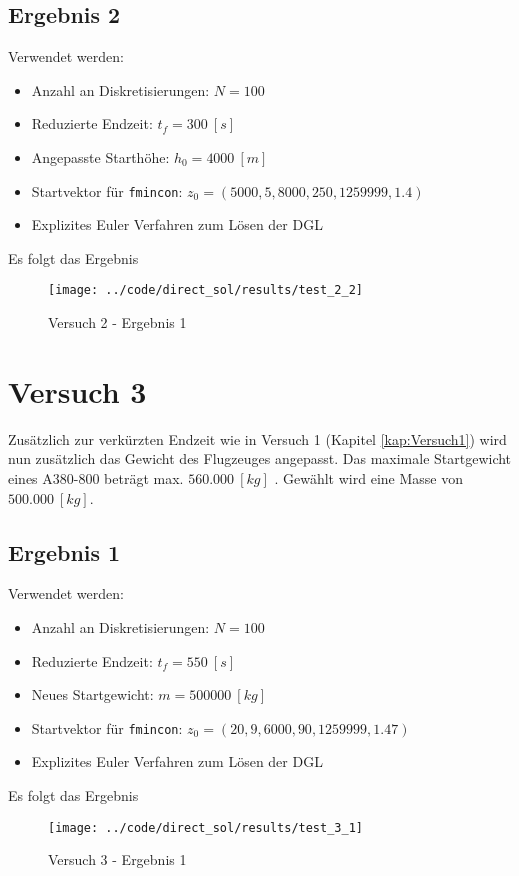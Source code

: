 \newpage
\subsection{Ergebnis 2}\label{kap:Versuch22}
Verwendet werden:
\begin{itemize}
\item Anzahl an Diskretisierungen: $N = 100$ 
\item Reduzierte Endzeit: $t_f = 300 \ [s]$
\item Angepasste Starthöhe: $h_0 = 4000 \ [m]$
\item Startvektor für \texttt{fmincon}: $z_0 = (5000,5,8000,250,1259999,1.4)$
\item Explizites Euler Verfahren zum Lösen der DGL
\end{itemize}
Es folgt das Ergebnis
\begin{figure}[H]
\begin{center}
\texttt{[image: ../code/direct\_sol/results/test\_2\_2]}
\caption{Versuch 2 - Ergebnis 1}\label{img:test_2_2}
\end{center}
\end{figure}
















\newpage
\section{Versuch 3}\label{kap:Versuch3}
Zusätzlich zur verkürzten Endzeit wie in Versuch 1 (Kapitel \ref{kap:Versuch1}) wird nun zusätzlich das Gewicht des Flugzeuges angepasst. Das maximale Startgewicht eines A380-800 beträgt max. $560.000 \ [kg]$ \cite{A380Tech}. Gewählt wird eine Masse von $500.000 \ [kg]$.

\subsection{Ergebnis 1}\label{kap:Versuch31}
Verwendet werden:
\begin{itemize}
\item Anzahl an Diskretisierungen: $N = 100$ 
\item Reduzierte Endzeit: $t_f = 550 \ [s]$
\item Neues Startgewicht: $m = 500000 \ [kg]$
\item Startvektor für \texttt{fmincon}: $z_0 = (20,9,6000,90,1259999,1.47)$
\item Explizites Euler Verfahren zum Lösen der DGL
\end{itemize}
Es folgt das Ergebnis
\begin{figure}[H]
\begin{center}
\texttt{[image: ../code/direct\_sol/results/test\_3\_1]}
\caption{Versuch 3 - Ergebnis 1}\label{img:test_3_1}
\end{center}
\end{figure}

